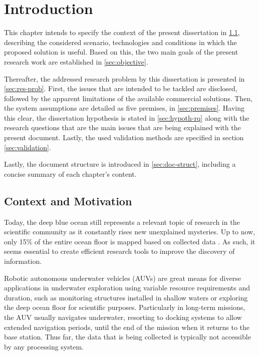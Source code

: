 \chapter{Introduction} \label{chap:intro}

This chapter intends to specify the context of the present dissertation in \ref{sec:context}, describing the considered scenario, technologies and conditions in which the proposed solution is useful. Based on this, the two main goals of the present research work are established in \ref{sec:objective}.

Thereafter, the addressed research problem by this dissertation is presented in \ref{sec:res-prob}. First, the issues that are intended to be tackled are disclosed, followed by the apparent limitations of the available commercial solutions. Then, the system assumptions are detailed as five premises, in \ref{sec:premises}. Having this clear, the dissertation hypothesis is stated in \ref{sec:hypoth-rq} along with the research questions that are the main issues that are being explained with the present document. Lastly, the used validation methods are specified in section \ref{sec:validation}.

 Lastly, the document structure is introduced in \ref{sec:doc-struct}, including a concise summary of each chapter's content.

\section{Context and Motivation} \label{sec:context}

Today, the deep blue ocean still represents a relevant topic of research in the scientific community as it constantly rises new unexplained mysteries. Up to now, only 15\% of the entire ocean floor is mapped based on collected data \cite{deeperblue}. As such, it seems essential to create efficient research tools to improve the discovery of information.

Robotic autonomous underwater vehicles (AUVs) are great means for diverse applications in underwater exploration using variable resource requirements and duration, such as monitoring structures installed in shallow waters or exploring the deep ocean floor for scientific purposes. Particularly in long-term missions, the AUV usually navigates underwater, resorting to docking systems to allow extended navigation periods, until the end of the mission when it returns to the base station. Thus far, the data that is being collected is typically not accessible by any processing system. 

